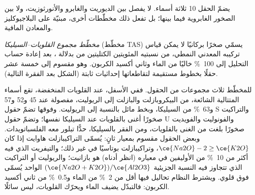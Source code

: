 \begin{omfigure}
\par{}
\end{omfigure}

يضمّ الحقل 10 ثلاثة أسماء.  لا يفصل بين الديوريت والغابرو
والأنورثوزيت، ولا بين الصخور الغابروية فيما بينها؛ بل تفعل ذلك مخطّطات أخرى، مبنيّة على
البلاجيوكليز والمعادن المافية.

\begin{definition}\label{def:b2:magmatic-series:tas}
\emph{مخطّط مجموع القلويات--السيليكا} (مخطّط
TAS) يسمّي صخرًا بركانيًا لا يمكن قياس تركيبه المعدني النمطي، من نسبتيه المئويتين
الكتليتين من  بدلالة ، بعد إعادة حساب التحليل
إلى \qty{100}{\percent} خاليًا من الماء وثاني أكسيد الكربون. وهو مقسوم
إلى خمسة عشر حقلًا بخطوط مستقيمة لتقاطعاتها إحداثيات ثابتة
(الشكل بعد الفقرة التالية).
\end{definition}

للمخطّط ثلاث مجموعات من الحقول. ففي الأسفل، عند القلويات المنخفضة، تقع
أسماء المتتالية الشائعة، من البيكروبازلت والبازلت إلى الريوليت، مفصولة عند 45 و52
و57 و\qty{63}{\percent} من السيليكا، وبخط مائل بالنسبة إلى الريوليت. وفوقها تضمّ حقول S والتراكيت صخورًا أغنى
بالقلويات عند السيليكا نفسها؛ وتضمّ حقول U والفونوليت والفويديت صخورًا بلغت من الغنى
بالقلويات، ومن الفقر بالسيليكا، حدًّا تبلور معه الفلسباتويدات. وبعض الحقول
مقسوم بمعيار ثانٍ: يُسمّى التراكيبازلت هاوايت إذا كان $\ce{Na2O} - 2
\ge \ce{K2O}$، وتراكيبازلت بوتاسيًا في غير ذلك؛ والتيفريت الذي فيه أكثر من
\qty{10}{\percent} من الأوليفين في معياره (انظر أدناه) هو بازانيت؛ والريوليت أو التراكيت الذي
تتجاوز فيه النسبة الجزيئية $(\ce{Na2O + K2O})/\ce{Al2O3}$ الواحد يُسمّى فوق قلوي. ويشترط النظام
تحاليل فيها أقل من \qty{2}{\percent} من الماء و\qty{0.5}{\percent} من
ثاني أكسيد الكربون: فالتبدّل يضيف الماء ويحرّك القلويات،  ليس
سائلًا.

